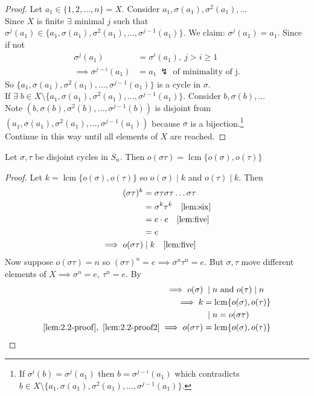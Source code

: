 \begin{proof}
Let $a_1 \in \{ 1, 2, \ldots, n \} = X$.
Consider $a_1, \sigma(a_1), \sigma^2(a_1), \ldots$\\
Since $X$ is finite $\exists$ minimal $j$ such that $\sigma^j(a_1) \in \{ a_1, \sigma(a_1), \sigma^2(a_1), \ldots, \sigma^{j-1}(a_1) \}$.
We claim: $\sigma^j(a_1) = a_1$.
Since if not \begin{align*}
    \sigma^j(a_1) &= \sigma^i(a_1),\ j > i \geq 1 \\
    \implies \sigma^{j - i}(a_1) &= a_1 \ ↯ \text{ of minimality of j.}
\end{align*}
So $\{ a_1, \sigma(a_1), \sigma^2(a_1), \ldots, \sigma^{j-1}(a_1) \}$ is a cycle in $\sigma$.\\
If $\exists \; b \in X \setminus \{ a_1, \sigma(a_1), \sigma^2(a_1), \ldots, \sigma^{j-1}(a_1) \}$.
Consider $b, \sigma(b), \ldots$\\
Note $\left(b, \sigma(b), \sigma^2(b), \ldots, \sigma^{j-1}(b) \right)$ is disjoint from $\left( a_1, \sigma(a_1), \sigma^2(a_1), \ldots, \sigma^{j-1}(a_1) \right)$ because $\sigma$ is a bijection.\footnote{If $\sigma^i(b) = \sigma^j(a_1)$ then $b = \sigma^{j - i}(a_1)$ which contradicts $b \in X \setminus \{ a_1, \sigma(a_1), \sigma^2(a_1), \ldots, \sigma^{j-1}(a_1) \}$.}\\
Continue in this way until all elements of $X$ are reached.
\end{proof}

\begin{lemma}
Let $\sigma, \tau$ be disjoint cycles in $S_n$.
Then $o(\sigma \tau) = \operatorname{lcm} \{ o(\sigma), o(\tau) \}$
\end{lemma}

\begin{proof}
Let $k = \operatorname{lcm} \{ o(\sigma), o(\tau) \}$ so $o(\sigma) \mid k$ and $o(\tau) \mid k$.
Then \begin{align}
    (\sigma \tau)^k &= \sigma \tau \sigma \tau \ldots \sigma \tau \notag\\
    &= \sigma^k \tau^k \quad \text{\Cref{lem:six}} \notag \\
    &= e \cdot e \quad \text{\Cref{lem:five}} \notag\\
    &= e \notag \\
    \implies o(\sigma \tau) &\mid k \quad \text{\Cref{lem:five}} \label{lem:2.2-proof}
\end{align}
Now suppose $o(\sigma \tau) = n$ so $(\sigma \tau)^n = e \implies \sigma^n \tau^n = e$.
But $\sigma, \tau$ move different elements of $X \implies \sigma^n = e,\ \tau^n = e$.
By 
\begin{align}
    \implies o(\sigma) &\;\mid n \text{ and } o(\tau) \mid n \notag\\
    \implies k &= \operatorname{lcm} \{ o(\sigma), o(\tau) \} \notag\\
    &\;\mid n = o(\sigma \tau) \label{lem:2.2-proof2} \\
    \cref{lem:2.2-proof},\ \cref{lem:2.2-proof2} \implies o(\sigma \tau) &= \operatorname{lcm} \{ o(\sigma), o(\tau) \} \notag
\end{align}
\end{proof}

